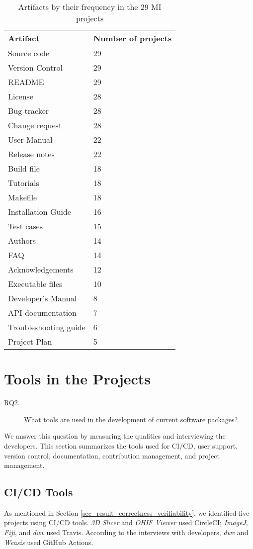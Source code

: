 \begin{table}[H]
\centering
\begin{tabular}{ll}
\hline
Artifact & Number of projects \\ \hline
Source code & 29 \\
Version Control & 29 \\
README & 29 \\
License & 28 \\
Bug tracker & 28 \\
Change request & 28 \\
User Manual & 22 \\
Release notes & 22 \\
Build file & 18 \\
Tutorials & 18 \\
Makefile & 18 \\
Installation Guide & 16 \\
Test cases & 15 \\
Authors & 14 \\
FAQ & 14 \\
Acknowledgements & 12 \\
Executable files & 10 \\
Developer's Manual & 8 \\
API documentation & 7 \\
Troubleshooting guide & 6 \\
Project Plan & 5 \\ \hline
\end{tabular}
\caption{\label{tab_artifacts_frequency}Artifacts by their frequency in the 29 MI projects}
\end{table}

\section{Tools in the Projects}
\label{sec_rq_tools}
\begin{description}
\item[RQ2.] What tools are used in the development of current software packages?
\end{description}

We answer this question by measuring the qualities and interviewing the developers. This section summarizes the tools used for CI/CD, user support, version control, documentation, contribution management, and project management. 

\subsection{CI/CD Tools}
As mentioned in Section \ref{sec_result_correctness_verifiability}, we identified five projects using CI/CD tools. \textit{3D Slicer} and \textit{OHIF Viewer} used CircleCI; \textit{ImageJ}, \textit{Fiji}, and \textit{dwv} used Travis. According to the interviews with developers, \textit{dwv} and \textit{Weasis} used GitHub Actions.

